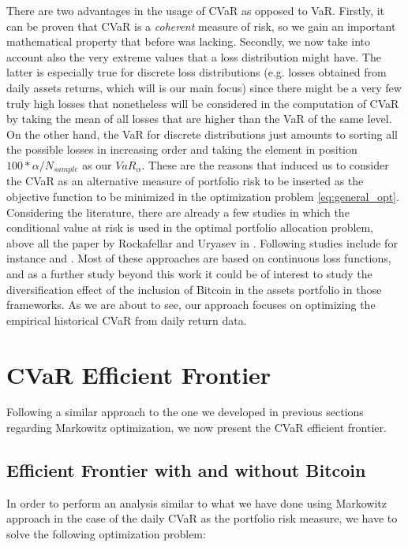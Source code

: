 There are two advantages in the usage of CVaR as opposed to VaR. Firstly, it can be proven that CVaR is a \textit{coherent} measure of risk, so we gain an important mathematical property that before was lacking. Secondly, we now take into account also the very extreme values that a loss distribution might have. The latter is especially true for discrete loss distributions (e.g. losses obtained from daily assets returns, which will is our main focus) since there might be a very few  truly high losses that nonetheless will be considered in the computation of CVaR by taking the mean of all losses that are higher than the VaR of the same level. On the other hand, the VaR for discrete distributions just amounts to sorting all the possible losses in increasing order and taking the element in position $100*\alpha / N_{sample}$ as our $VaR_\alpha$. 
\bigskip
These are the reasons that induced us to consider the CVaR as an alternative measure of portfolio risk to be inserted as the objective function to be minimized in the optimization problem \eqref{eq:general_opt}. 
Considering the literature, there are already a few studies in which the conditional value at risk is used in the optimal portfolio allocation problem,  above all the paper by Rockafellar and Uryasev in \citep{ROCKAFELLAR2000}. Following studies include for instance  \citep{DICLEMENTE2002} and \citep{QUARANTA2008}. 
Most of these approaches are based on continuous loss functions, and as a further study beyond this work it could be of interest to study the diversification effect of the inclusion of Bitcoin in the assets portfolio in those frameworks. As we are about to see, our approach  focuses on optimizing the empirical historical CVaR from daily return data.




\section{CVaR Efficient Frontier}
\label{sec:cvar_frontier}

Following a similar approach to the one we developed in previous sections regarding Markowitz optimization, we  now present the CVaR efficient frontier.

\subsection{Efficient Frontier with and without Bitcoin}


In order to perform an  analysis similar to what we have done using Markowitz approach in the case of the daily CVaR as the portfolio risk measure, we have to solve the following optimization problem:

